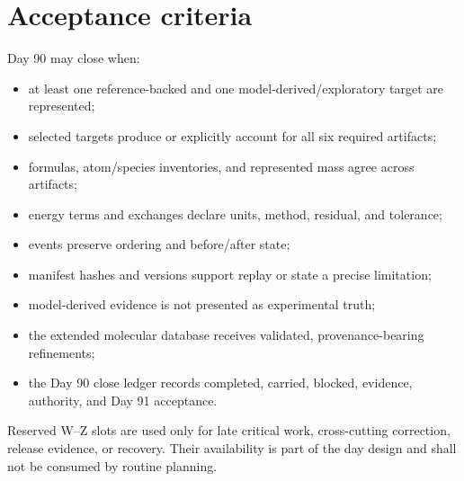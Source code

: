\documentclass[10pt]{article}
\begin{document}
\section*{Acceptance criteria}
Day 90 may close when:
\begin{itemize}
\item at least one reference-backed and one model-derived/exploratory target are represented;
\item selected targets produce or explicitly account for all six required artifacts;
\item formulas, atom/species inventories, and represented mass agree across artifacts;
\item energy terms and exchanges declare units, method, residual, and tolerance;
\item events preserve ordering and before/after state;
\item manifest hashes and versions support replay or state a precise limitation;
\item model-derived evidence is not presented as experimental truth;
\item the extended molecular database receives validated, provenance-bearing refinements;
\item the Day 90 close ledger records completed, carried, blocked, evidence, authority, and Day 91 acceptance.
\end{itemize}

Reserved W--Z slots are used only for late critical work, cross-cutting correction, release evidence, or recovery. Their availability is part of the day design and shall not be consumed by routine planning.
\end{document}

